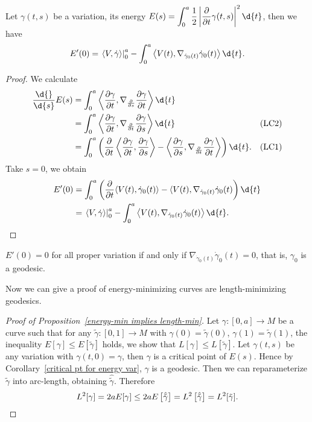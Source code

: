 \begin{prop}
    Let $\gamma(t,s)$ be a variation, its energy $\displaystyle E(s)=\int_0^a\frac{1}{2}\left|\frac{\partial{}}{\partial{t}}\gamma(t,s)\right|^2\d{t}$, then we have
    \[E'(0)=\left.\langle V,\dot{\gamma}\rangle\right|^a_0-\int_0^a\left\langle V(t),\nabla_{\dot{\gamma}_0(t)}\dot{\gamma}_0(t)\right\rangle\d{t}.\]
\end{prop}
\begin{proof}
    We calculate
    \begin{align*}
        \frac{\d{}}{\d{s}}E(s)&=\int_0^a\left\langle\frac{\partial{\gamma}}{\partial{t}},\nabla_{\frac{\partial{}}{\partial{s}}}\frac{\partial{\gamma}}{\partial{t}}\right\rangle\d{t} &\\
        &=\int_0^a\left\langle\frac{\partial{\gamma}}{\partial{t}},\nabla_{\frac{\partial{}}{\partial{t}}}\frac{\partial{\gamma}}{\partial{s}}\right\rangle\d{t} &\text{(LC2)}\\
        &=\int_0^a\left(\frac{\partial}{\partial{t}}\left\langle\frac{\partial{\gamma}}{\partial{t}},\frac{\partial{\gamma}}{\partial{s}}\right\rangle-\left\langle\frac{\partial{\gamma}}{\partial{s}},\nabla_{\frac{\partial{}}{\partial{t}}}\frac{\partial{\gamma}}{\partial{t}}\right\rangle\right)\d{t}. &\text{(LC1)}
    \end{align*}
    Take $s=0$, we obtain
    \begin{align*}
        E'(0)&=\int_0^a\left(\frac{\partial{}}{\partial{t}}\langle V(t),\dot{\gamma}_0(t)\rangle-\langle V(t),\nabla_{\dot{\gamma}_0(t)}\dot{\gamma}_0(t)\right)\d{t}\\
        &=\left.\langle V,\dot{\gamma}\rangle\right|^a_0-\int_0^a\left\langle V(t),\nabla_{\dot{\gamma}_0(t)}\dot{\gamma}_0(t)\right\rangle\d{t}.\qedhere
    \end{align*}
\end{proof}

\begin{cor}\label{critical pt for energy var}
    $E'(0)=0$ for all proper variation if and only if $\nabla_{\dot{\gamma}_0(t)}\dot{\gamma}_0(t)=0$, that is, $\gamma_0$ is a geodesic.
\end{cor}

Now we can give a proof of energy-minimizing curves are length-minimizing geode\-sics.
\begin{proof}[Proof of Proposition~\ref{energy-min implies length-min}]
    Let $\gamma:[0,a]\to M$ be a curve such that for any $\tilde{\gamma}:[0,1]\to M$ with $\gamma(0)=\tilde{\gamma}(0)$, $\gamma(1)=\tilde{\gamma}(1)$, the inequality $E[\gamma]\leq E[\tilde{\gamma}]$ holds, we show that $L[\gamma]\leq L[\tilde{\gamma}]$.
    Let $\gamma(t,s)$ be any variation with $\gamma(t,0)=\gamma$, then $\gamma$ is a critical point of $E(s)$.
    Hence by Corollary~\ref{critical pt for energy var}, $\gamma$ is a geodesic.
    Then we can reparameterize $\tilde{\gamma}$ into arc-length, obtaining $\hat{\tilde{\gamma}}$.
    Therefore
    \[L^2[\gamma]=2aE[\gamma]\leq 2aE\left[\hat{\tilde{\gamma}}\right]=L^2\left[\hat{\tilde{\gamma}}\right]=L^2[\tilde{\gamma}].\qedhere\]
\end{proof}

